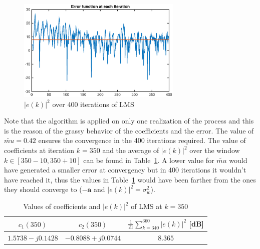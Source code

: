 \documentclass[10pt]{article}
\numberwithin{equation}{section}
\begin{document}
\begin{figure}[h!]
  \centering
  \includegraphics[width = 0.7\textwidth]{images/lms_err}
  \caption{$|e(k)|^2$ over 400 iterations of LMS}
  \label{fig:err_lms}
\end{figure}

Note that the algorithm is applied on only one realization of the process and this is the reason of the grassy behavior of the coefficients and the error. The value of $\tilde{mu} = 0.42$ ensures the convergence in the 400 iterations required. The value of coefficients at iteration $k = 350$ and the average of $|e(k)|^2$ over the window $k \in [350 - 10, 350 + 10]$ can be found in Table~\ref{table:lms_conv}. A lower value for $\tilde{mu}$ would have generated a smaller error at convergency but in 400 iterations it wouldn't have reached it, thus the values in Table~\ref{table:lms_conv} would have been farther from the ones they should converge to ($-\mathbf{a}$ and $|e(k)|^2 = \sigma_w^2$).
\begin{table}[h!]
  \centering
  \begin{tabular}{c|c|c}
    $c_1(350)$ &   $c_2(350)$ & $\frac{1}{21}\sum_{k=340}^{360} |e(k)|^2$ [dB] \\ \hline
    $1.5738 - j0.1428$ & $-0.8088 + j0.0744$ & $8.365$
  \end{tabular}
  \caption{Values of coefficients and $|e(k)|^2$ of LMS at $k=350$}
  \label{table:lms_conv}
\end{table}
\end{document}
